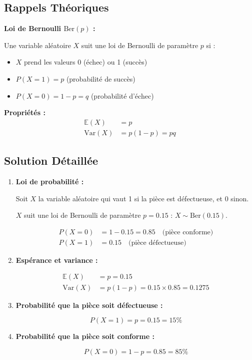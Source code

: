 \documentclass[11pt,a4paper]{article}
\newcommand{\Var}{\text{Var}}
\newcommand{\E}{\mathbb{E}}
\newcommand{\Ber}{\text{Ber}}
\begin{document}
\subsection{Rappels Théoriques}

\begin{rappelbox}
\textbf{Loi de Bernoulli $\Ber(p)$ :}

Une variable aléatoire $X$ suit une loi de Bernoulli de paramètre $p$ si :
\begin{itemize}
    \item $X$ prend les valeurs 0 (échec) ou 1 (succès)
    \item $P(X = 1) = p$ (probabilité de succès)
    \item $P(X = 0) = 1 - p = q$ (probabilité d'échec)
\end{itemize}

\textbf{Propriétés :}
\begin{align}
\E(X) &= p \\
\Var(X) &= p(1-p) = pq
\end{align}
\end{rappelbox}

\subsection{Solution Détaillée}

\begin{enumerate}
    \item \textbf{Loi de probabilité :}
    
    Soit $X$ la variable aléatoire qui vaut 1 si la pièce est défectueuse, et 0 sinon.
    
    $X$ suit une loi de Bernoulli de paramètre $p = 0.15$ : $X \sim \Ber(0.15)$.
    
    \begin{align}
    P(X = 0) &= 1 - 0.15 = 0.85 \quad \text{(pièce conforme)} \\
    P(X = 1) &= 0.15 \quad \text{(pièce défectueuse)}
    \end{align}
    
    \item \textbf{Espérance et variance :}
    
    \begin{align}
    \E(X) &= p = 0.15 \\
    \Var(X) &= p(1-p) = 0.15 \times 0.85 = 0.1275
    \end{align}
    
    \item \textbf{Probabilité que la pièce soit défectueuse :}
    
    $$P(X = 1) = p = 0.15 = 15\%$$
    
    \item \textbf{Probabilité que la pièce soit conforme :}
    
    $$P(X = 0) = 1 - p = 0.85 = 85\%$$
\end{enumerate}
\end{document}
